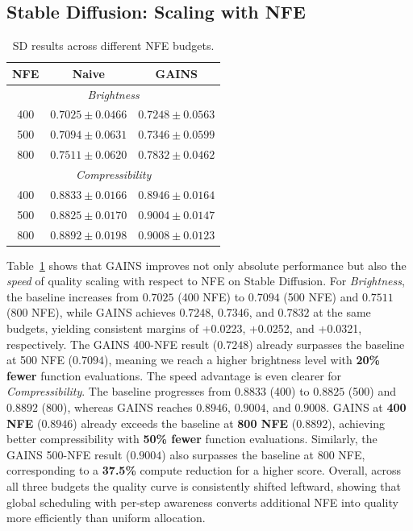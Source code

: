 \subsection{Stable Diffusion: Scaling with NFE}
\label{sec:exp-sd-scaling}
\begin{table}[t]
\centering
\caption{SD results across different NFE budgets.}
\label{tab:sd_budget}
\begin{tabular}{c|c|c}
\toprule
\textbf{NFE} & \textbf{Naive} & \textbf{GAINS} \\
\midrule
\multicolumn{3}{c}{\textit{Brightness}} \\
\midrule
400 & $0.7025 \pm 0.0466$ & $0.7248 \pm 0.0563$ \\
500 & $0.7094 \pm 0.0631$ & $0.7346 \pm 0.0599$ \\
800 & $0.7511 \pm 0.0620$ & $0.7832 \pm 0.0462$ \\
\midrule
\multicolumn{3}{c}{\textit{Compressibility}} \\
\midrule
400 & $0.8833 \pm 0.0166$ & $0.8946 \pm 0.0164$ \\
500 & $0.8825 \pm 0.0170$ & $0.9004 \pm 0.0147$ \\
800 & $0.8892 \pm 0.0198$ & $0.9008 \pm 0.0123$ \\
\bottomrule
\end{tabular}
\end{table}

Table~\ref{tab:sd_budget} shows that GAINS improves not only absolute
performance but also the \emph{speed} of quality scaling with respect to NFE on
Stable Diffusion.
For \textit{Brightness}, the baseline increases from $0.7025$ (400 NFE) to
$0.7094$ (500 NFE) and $0.7511$ (800 NFE), while GAINS achieves
$0.7248$, $0.7346$, and $0.7832$ at the same budgets, yielding consistent
margins of +0.0223, +0.0252, and +0.0321, respectively.
The GAINS 400-NFE result ($0.7248$) already surpasses the baseline at
500 NFE ($0.7094$), meaning we reach a higher brightness level with
\textbf{20\% fewer} function evaluations.
The speed advantage is even clearer for \textit{Compressibility}.
The baseline progresses from $0.8833$ (400) to $0.8825$ (500) and $0.8892$ (800),
whereas GAINS reaches $0.8946$, $0.9004$, and $0.9008$.
GAINS at \textbf{400 NFE} ($0.8946$) already exceeds the baseline
at \textbf{800 NFE} ($0.8892$), achieving better compressibility with
\textbf{50\% fewer} function evaluations.
Similarly, the GAINS 500-NFE result ($0.9004$) also surpasses the baseline at 800 NFE,
corresponding to a \textbf{37.5\%} compute reduction for a higher score.
Overall, across all three budgets the quality curve is consistently shifted
leftward, showing that global scheduling with per-step awareness converts
additional NFE into quality more efficiently than uniform allocation.

